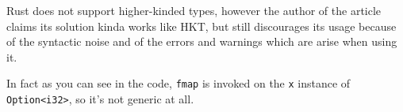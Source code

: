 
Rust does not support higher-kinded types, however the author of the article claims its solution kinda works like HKT, but still discourages its usage because of the syntactic noise and of the errors and warnings which are arise when using it.

In fact as you can see in the code, \lstinline|fmap| is invoked on the \lstinline|x| instance of \lstinline|Option<i32>|, so it's not generic at all.

